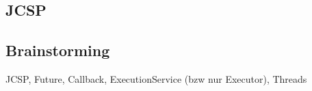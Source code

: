 
\subsection{JCSP}

\subsection{Brainstorming}
JCSP, Future, Callback, ExecutionService (bzw nur Executor), Threads
